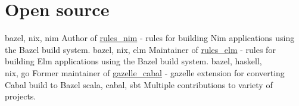 \section{Open source}
      {bazel, nix, nim}
      {Author of \href{https://github.com/kczulko/rules\_nim}{rules\_nim} - rules for building Nim applications using the Bazel build system.
      }
      {bazel, nix, elm}
      {Maintainer of \href{https://github.com/kczulko/rules\_elm}{rules\_elm} - rules for building Elm applications using the Bazel build system.
      }
      {bazel, haskell,\\nix, go}
      {Former maintainer of \href{https://github.com/tweag/gazelle\_cabal}{gazelle\_cabal} - gazelle extension for converting Cabal build to Bazel
      }
      {scala, cabal, sbt}
      {Multiple contributions to variety of projects.
      }
